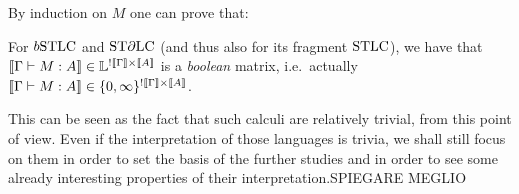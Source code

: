 By induction on $M$ %
one can prove that:

\begin{proposition}\label{prop:descrete}
 For $\BSTLC$ and $\mathrm{ST}\partial\mathrm{LC}$ (and thus also for its fragment $\mathrm{STLC}$), we have that $\llbracket\Gamma\vdash M:A\rrbracket\in\mathbb{L}^{!\llbracket\Gamma\rrbracket\times\llbracket A\rrbracket}$ is a \emph{boolean} matrix, i.e.\ actually $\llbracket\Gamma\vdash M:A\rrbracket\in\{0,\infty\}^{!\llbracket\Gamma\rrbracket\times\llbracket A\rrbracket}$.
\end{proposition}

This can be seen as the fact that such calculi are relatively trivial, from this point of view.
Even if the interpretation of those languages is trivia, we shall still focus on them in order to set the basis of the further studies and in order to see some already interesting properties of their interpretation.{\color{red}SPIEGARE MEGLIO}


